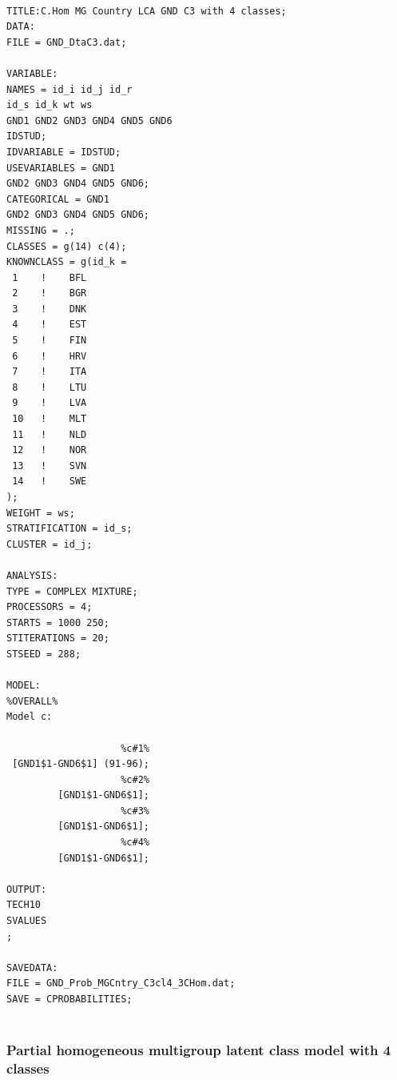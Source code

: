 \documentclass[12pt,a4paper,oneside]{reedthesis}
\begin{document}
~
\begin{verbatim}
TITLE:C.Hom MG Country LCA GND C3 with 4 classes;
DATA: 
FILE = GND_DtaC3.dat;

VARIABLE: 
NAMES = id_i id_j id_r
id_s id_k wt ws
GND1 GND2 GND3 GND4 GND5 GND6
IDSTUD;
IDVARIABLE = IDSTUD;
USEVARIABLES = GND1
GND2 GND3 GND4 GND5 GND6;
CATEGORICAL = GND1
GND2 GND3 GND4 GND5 GND6;
MISSING = .;
CLASSES = g(14) c(4);
KNOWNCLASS = g(id_k =
 1    !    BFL 
 2    !    BGR 
 3    !    DNK 
 4    !    EST 
 5    !    FIN 
 6    !    HRV 
 7    !    ITA 
 8    !    LTU 
 9    !    LVA 
 10   !    MLT 
 11   !    NLD 
 12   !    NOR 
 13   !    SVN 
 14   !    SWE 
);
WEIGHT = ws;
STRATIFICATION = id_s;
CLUSTER = id_j;
 
ANALYSIS:
TYPE = COMPLEX MIXTURE;
PROCESSORS = 4;
STARTS = 1000 250;
STITERATIONS = 20;
STSEED = 288;

MODEL:
%OVERALL%
Model c:
 
                    %c#1%
 [GND1$1-GND6$1] (91-96);
                    %c#2%
         [GND1$1-GND6$1];
                    %c#3%
         [GND1$1-GND6$1];
                    %c#4%
         [GND1$1-GND6$1];
 
OUTPUT: 
TECH10
SVALUES
;

SAVEDATA:
FILE = GND_Prob_MGCntry_C3cl4_3CHom.dat;
SAVE = CPROBABILITIES;
 
\end{verbatim}
\hypertarget{partial-homogeneous-multigroup-latent-class-model-with-4-classes}{%
\subsubsection{Partial homogeneous multigroup latent class model with 4 classes}\label{partial-homogeneous-multigroup-latent-class-model-with-4-classes}}
\end{document}
